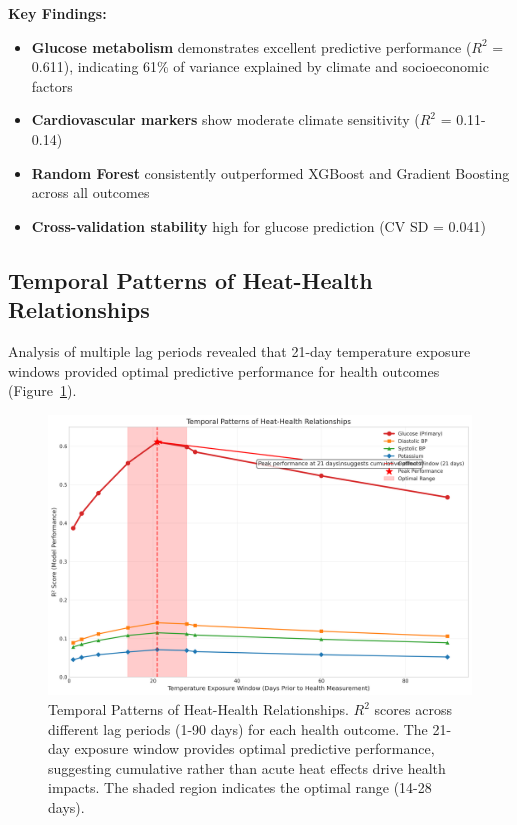 \documentclass[11pt,a4paper]{article}
\begin{document}
\textbf{Key Findings:}
\begin{itemize}
\item \textbf{Glucose metabolism} demonstrates excellent predictive performance ($R^2$ = 0.611), indicating 61\% of variance explained by climate and socioeconomic factors
\item \textbf{Cardiovascular markers} show moderate climate sensitivity ($R^2$ = 0.11-0.14)
\item \textbf{Random Forest} consistently outperformed XGBoost and Gradient Boosting across all outcomes
\item \textbf{Cross-validation stability} high for glucose prediction (CV SD = 0.041)
\end{itemize}

\subsection{Temporal Patterns of Heat-Health Relationships}

Analysis of multiple lag periods revealed that 21-day temperature exposure windows provided optimal predictive performance for health outcomes (Figure~\ref{fig:temporal_patterns}).

\begin{figure}[H]
\centering
\includegraphics[width=\textwidth]{Figure2_TemporalPatterns.png}
\caption{Temporal Patterns of Heat-Health Relationships. $R^2$ scores across different lag periods (1-90 days) for each health outcome. The 21-day exposure window provides optimal predictive performance, suggesting cumulative rather than acute heat effects drive health impacts. The shaded region indicates the optimal range (14-28 days).}
\label{fig:temporal_patterns}
\end{figure}
\end{document}
